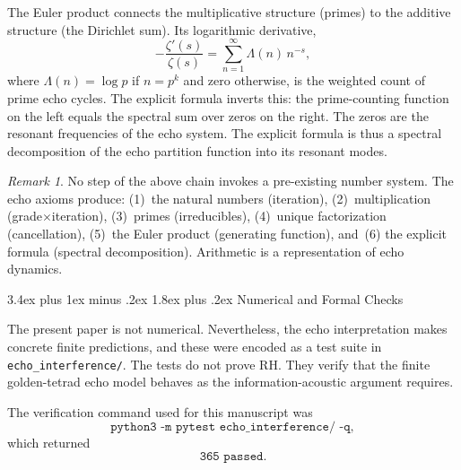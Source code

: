 \documentclass[11pt,a4paper]{article}
\makeatletter
\theoremstyle{plain}
\theoremstyle{definition}
\theoremstyle{remark}
\newtheorem{remark}[theorem]{Remark}
\numberwithin{equation}{section}
\renewcommand{\section}{%
  \@startsection{section}{1}{0pt}%
    {3.4ex plus 1ex minus .2ex}%
    {1.8ex plus .2ex}%
    {\normalfont\LARGE\bfseries\color{headingAccent}}%
}
\makeatother
\begin{document}
The Euler product connects the multiplicative structure (primes) to
the additive structure (the Dirichlet sum).  Its logarithmic
derivative,
\[
  -\frac{\zeta'(s)}{\zeta(s)}=\sum_{n=1}^\infty\Lambda(n)\,n^{-s},
\]
where \(\Lambda(n)=\log p\) if \(n=p^k\) and zero otherwise, is the
weighted count of prime echo cycles.  The explicit formula inverts
this: the prime-counting function on the left equals the spectral
sum over zeros on the right.  The zeros are the resonant frequencies
of the echo system.  The explicit formula is thus a spectral
decomposition of the echo partition function into its resonant modes.

\begin{remark}
No step of the above chain invokes a pre-existing number system.
The echo axioms produce: (1)~the natural numbers (iteration), (2)~multiplication
(grade\(\times\)iteration), (3)~primes (irreducibles), (4)~unique
factorization (cancellation), (5)~the Euler product (generating function),
and~(6) the explicit formula (spectral decomposition).  Arithmetic
is a representation of echo dynamics.
\end{remark}

\section{Numerical and Formal Checks}
\label{sec:numerics}

The present paper is not numerical.  Nevertheless, the echo
interpretation makes concrete finite predictions, and these were encoded
as a test suite in \texttt{echo\_interference/}.  The tests do not prove
RH.  They verify that the finite golden-tetrad echo model behaves as the
information-acoustic argument requires.

The verification command used for this manuscript was
\[
  \texttt{python3 -m pytest echo\_interference/ -q},
\]
which returned
\[
  \texttt{365 passed}.
\]
\end{document}
